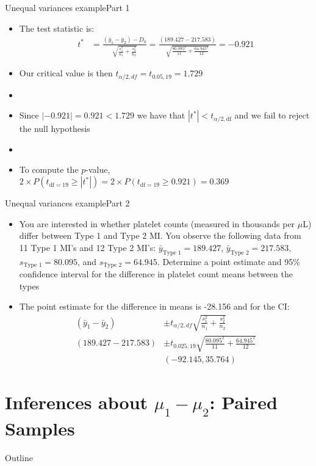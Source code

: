 \documentclass[xcolor=dvipsnames]{beamer}
\begin{document}
\begin{frame}{Unequal variances example}{Part 1}
\begin{itemize}
	\item The test statistic is: 
	\begin{align*}
	t^* &= \frac{(\bar{y}_1-\bar{y}_2)-D_0}{\sqrt{\frac{s^2_1}{n_1}+\frac{s^2_2}{n_2}}} = \frac{(189.427-217.583)}{\sqrt{\frac{80.095^2}{11}+\frac{64.945^2}{12}}} = -0.921
	\end{align*}
	\item Our critical value is then \pause $t_{\alpha/2, df} = t_{0.05, 19} = 1.729$ \pause
	\item[]
	\item Since $|-0.921| = 0.921 < 1.729$ we have that $|t^*| < t_{\alpha / 2, \text{df}}$ and we fail to reject the null hypothesis \pause
	\item[]
	\item To compute the $p$-value, $2 \times P(t_{\text{df} = 19} \geq |t^*|) = 2\times P(t_{\text{df} = 19} \geq 0.921) = 0.369$
\end{itemize}
\end{frame}

\begin{frame}{Unequal variances example}{Part 2}
\begin{itemize}
	\item You are interested in whether platelet counts (measured in thousands per $\mu$L) differ between Type 1 and Type 2 MI. You observe the following data from 11 Type 1 MI's and 12 Type 2 MI's: $\bar{y}_{\text{Type 1}}=189.427$, $\bar{y}_{\text{Type 2}}=217.583$, $s_{\text{Type 1}} = 80.095$, and $s_{\text{Type 2}} = 64.945$. Determine a point estimate and 95\% confidence interval for the difference in platelet count means between the types
	\item The point estimate for the difference in means is -28.156 and for the CI:\pause
	\begin{align*}
	(\bar{y}_1-\bar{y}_2) &\pm t_{\alpha / 2, df} \sqrt{\frac{s_1^2}{n_1}+\frac{s_2^2}{n_2}} \\
	(189.427-217.583) &\pm t_{0.025,19} \sqrt{\frac{80.095^2}{11}+\frac{64.945^2}{12}} \\
	& (-92.145, 35.764)
	\end{align*}
\end{itemize}
\end{frame}

\section{Inferences about $\mu_1 - \mu_2$: Paired Samples}
\begin{frame}{Outline}
\tableofcontents[currentsection,subsectionstyle=show/shaded/hide]
\end{frame}
\end{document}
